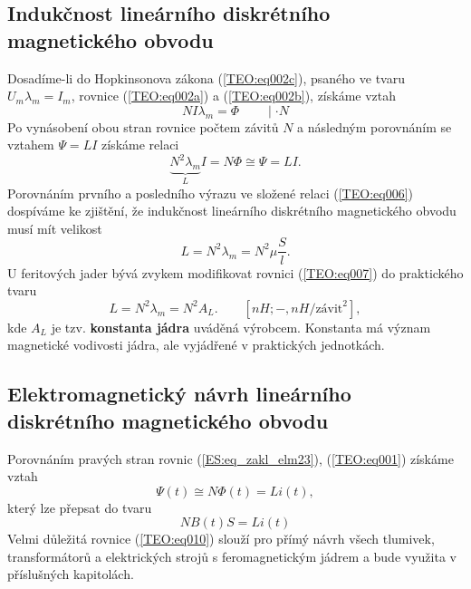 {    \subsection{Indukčnost lineárního diskrétního magnetického obvodu}
      Dosadíme-li do Hopkinsonova zákona (\ref{TEO:eq002c}), psaného ve tvaru \(U_m\lambda_m=I_m\), 
      rovnice (\ref{TEO:eq002a}) a (\ref{TEO:eq002b}), získáme vztah
      \begin{equation}  \label{TEO:eq005}
        NI\lambda_m = \Phi\qquad\mid \cdot N
      \end{equation}
      Po vynásobení obou stran rovnice počtem závitů \(N\) a následným porovnáním se vztahem \(\Psi 
      = LI\) získáme relaci
      \begin{equation}  \label{TEO:eq006}
        \underbrace{N^2\lambda_m}_L I = N\Phi \cong\Psi = LI.
      \end{equation}
      Porovnáním prvního a posledního výrazu ve složené relaci (\ref{TEO:eq006}) dospíváme ke 
      zjištění, že indukčnost lineárního diskrétního magnetického obvodu musí mít velikost
      \begin{equation}  \label{TEO:eq007}
        \boxed{L = N^2\lambda_m = N^2\mu\frac{S}{l}.}
      \end{equation}
      U feritových jader bývá zvykem modifikovat rovnici (\ref{TEO:eq007}) do praktického tvaru 
      \begin{equation}  \label{TEO:eq008}
        \boxed{L = N^2\lambda_m = N^2A_L.} \qquad [nH; -, nH/\text{závit}^2],
      \end{equation}
      kde \(A_L\) je tzv. \textbf{konstanta jádra} uváděná výrobcem. Konstanta má význam magnetické 
      vodivosti jádra, ale vyjádřené v praktických jednotkách.

    \subsection{Elektromagnetický návrh lineárního diskrétního magnetického obvodu}
       Porovnáním pravých stran rovnic (\ref{ES:eq_zakl_elm23}), (\ref{TEO:eq001}) získáme vztah
      \begin{equation}  \label{TEO:eq009}
        \Psi(t) \cong N\Phi(t) = Li(t),
      \end{equation}
      který lze přepsat do tvaru
      \begin{equation}  \label{TEO:eq010}
        \boxed{NB(t)S = Li(t)}
      \end{equation}
      Velmi důležitá rovnice (\ref{TEO:eq010}) slouží pro přímý návrh všech tlumivek, 
      transformátorů a elektrických strojů s feromagnetickým jádrem a bude využita v příslušných 
      kapitolách.
      
}
